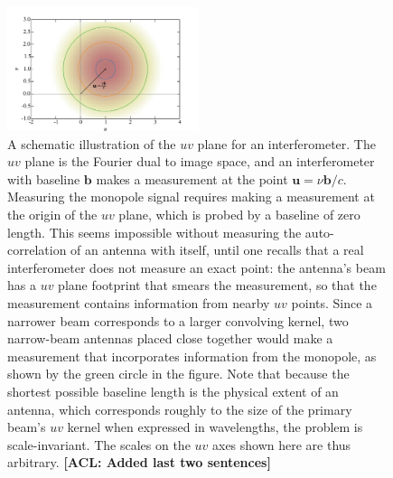 \documentclass[twocolumn,apj,numberedappendix]{emulateapj}
\def\b{\mathbf{b}}
\newcommand{\acl}[1]{{\color{red} \textbf{[ACL:  #1]}}}
\begin{document}
\begin{figure}[h]
	\centering
	\includegraphics[width=0.50\textwidth]{figures/uv_cartoon.pdf}
	\caption{A schematic illustration of the $uv$ plane for an interferometer. The $uv$ plane is the Fourier dual to image space, and an interferometer with baseline $\b$ makes a measurement at the point $\mathbf{u} = \nu\b / c$. Measuring the monopole signal requires making a measurement at the origin of the $uv$ plane, which is probed by a baseline of zero length. This seems impossible without measuring the auto-correlation of an antenna with itself, until one recalls that a real interferometer does not measure an exact point: the antenna's beam has a $uv$ plane footprint that smears the measurement, so that the measurement contains information from nearby $uv$ points. Since a narrower beam corresponds to a larger convolving kernel, two narrow-beam antennas placed close together would make a measurement that incorporates information from the monopole, as shown by the green circle in the figure. Note that because the shortest possible baseline length is the physical extent of an antenna, which corresponds roughly to the size of the primary beam's $uv$ kernel when expressed in wavelengths, the problem is scale-invariant. The scales on the $uv$ axes shown here are thus arbitrary. \acl{Added last two sentences}}
	\label{fig:uv_cartoon}
\end{figure}
\end{document}

